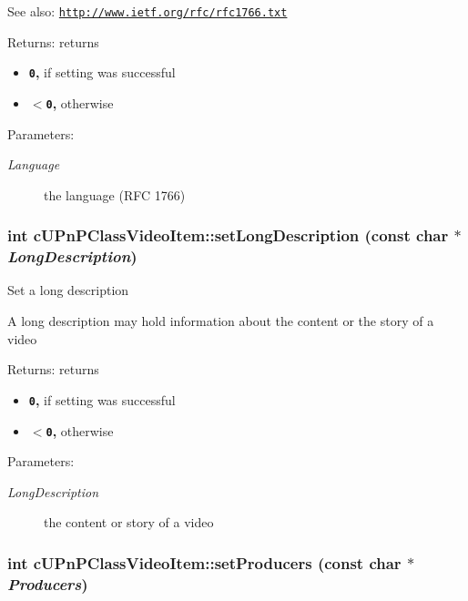 \begin{Desc}
\item[See also:]\href{http://www.ietf.org/rfc/rfc1766.txt}{\tt http://www.ietf.org/rfc/rfc1766.txt} \end{Desc}
\begin{Desc}
\item[Returns:]returns\begin{itemize}
\item {\bf {\tt 0},} if setting was successful\item {\bf {\tt $<$0},} otherwise \end{itemize}
\end{Desc}
\begin{Desc}
\item[Parameters:]
\begin{description}
\item[{\em Language}]the language (RFC 1766) \end{description}
\end{Desc}
\hypertarget{classcUPnPClassVideoItem_05c5b8394cbfcaeffe5f99c885496e3d}{
\subsubsection[{setLongDescription}]{\setlength{\rightskip}{0pt plus 5cm}int cUPnPClassVideoItem::setLongDescription (const char $\ast$ {\em LongDescription})}}
\label{classcUPnPClassVideoItem_05c5b8394cbfcaeffe5f99c885496e3d}


Set a long description

A long description may hold information about the content or the story of a video

\begin{Desc}
\item[Returns:]returns\begin{itemize}
\item {\bf {\tt 0},} if setting was successful\item {\bf {\tt $<$0},} otherwise \end{itemize}
\end{Desc}
\begin{Desc}
\item[Parameters:]
\begin{description}
\item[{\em LongDescription}]the content or story of a video \end{description}
\end{Desc}
\hypertarget{classcUPnPClassVideoItem_3812b8056c9d2c7d13a7734e4219b27b}{
\subsubsection[{setProducers}]{\setlength{\rightskip}{0pt plus 5cm}int cUPnPClassVideoItem::setProducers (const char $\ast$ {\em Producers})}}
\label{classcUPnPClassVideoItem_3812b8056c9d2c7d13a7734e4219b27b}


